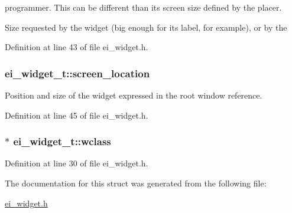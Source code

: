 programmer. This can be different than its screen size defined by the placer. 

Size requested by the widget (big enough for its label, for example), or by the 

Definition at line 43 of file ei\-\_\-widget.\-h.

\hypertarget{structei__widget__t_ad139e1541329b54e0b4c8d746e14b204}{
\subsubsection[{screen\-\_\-location}]{ ei\-\_\-widget\-\_\-t\-::screen\-\_\-location}}\label{structei__widget__t_ad139e1541329b54e0b4c8d746e14b204}


Position and size of the widget expressed in the root window reference. 



Definition at line 45 of file ei\-\_\-widget.\-h.

\hypertarget{structei__widget__t_a429e970e1d266252df4dbe55296b9f70}{
\subsubsection[{wclass}]{$\ast$ ei\-\_\-widget\-\_\-t\-::wclass}}\label{structei__widget__t_a429e970e1d266252df4dbe55296b9f70}


Definition at line 30 of file ei\-\_\-widget.\-h.



The documentation for this struct was generated from the following file\-:\begin{DoxyCompactItemize}
\item 
\hyperlink{ei__widget_8h}{ei\-\_\-widget.\-h}\end{DoxyCompactItemize}
